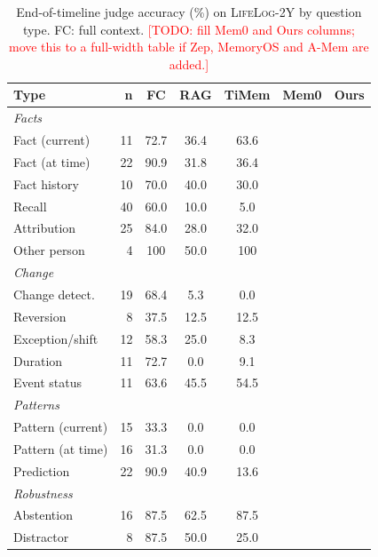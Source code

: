 \documentclass[11pt]{article}
\newcommand{\dataset}{\textsc{LifeLog-2Y}}
\newcommand{\todo}[1]{\textcolor{red}{[TODO: #1]}}
\begin{document}
\begin{table}[t]
  \centering
  \small
  \setlength{\tabcolsep}{3.5pt}
  \begin{tabular}{lrccccc}
    \toprule
    \textbf{Type} & \textbf{n} & \textbf{FC} & \textbf{RAG} & \textbf{TiMem} & \textbf{Mem0} & \textbf{Ours} \\
    \midrule
    \multicolumn{7}{l}{\textit{Facts}} \\
    Fact (current)  & 11 & 72.7 & 36.4 & 63.6 & & \\
    Fact (at time)  & 22 & 90.9 & 31.8 & 36.4 & & \\
    Fact history    & 10 & 70.0 & 40.0 & 30.0 & & \\
    Recall          & 40 & 60.0 & 10.0 & 5.0  & & \\
    Attribution     & 25 & 84.0 & 28.0 & 32.0 & & \\
    Other person    & 4  & 100  & 50.0 & 100  & & \\
    \midrule
    \multicolumn{7}{l}{\textit{Change}} \\
    Change detect.  & 19 & 68.4 & 5.3  & 0.0  & & \\
    Reversion       & 8  & 37.5 & 12.5 & 12.5 & & \\
    Exception/shift & 12 & 58.3 & 25.0 & 8.3  & & \\
    Duration        & 11 & 72.7 & 0.0  & 9.1  & & \\
    Event status    & 11 & 63.6 & 45.5 & 54.5 & & \\
    \midrule
    \multicolumn{7}{l}{\textit{Patterns}} \\
    Pattern (current) & 15 & 33.3 & 0.0 & 0.0  & & \\
    Pattern (at time) & 16 & 31.3 & 0.0 & 0.0  & & \\
    Prediction        & 22 & 90.9 & 40.9 & 13.6 & & \\
    \midrule
    \multicolumn{7}{l}{\textit{Robustness}} \\
    Abstention        & 16 & 87.5 & 62.5 & 87.5 & & \\
    Distractor        & 8  & 87.5 & 50.0 & 25.0 & & \\
    \bottomrule
  \end{tabular}
  \caption{End-of-timeline judge accuracy (\%) on \dataset{} by question type. FC: full context. \todo{fill Mem0 and Ours columns; move this to a full-width table if Zep, MemoryOS and A-Mem are added.}}
  \label{tab:v2-type}
\end{table}
\end{document}
